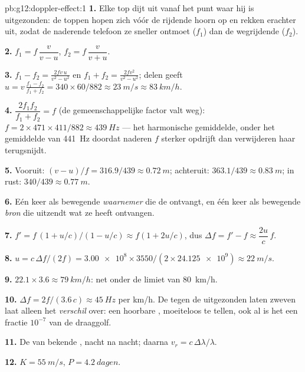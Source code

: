 \begin{solution}{pb:g12:doppler-effect:1}
\textbf{1.} Elke top dijt uit vanaf het punt waar hij is uitgezonden: de
toppen hopen zich vóór de rijdende hoorn op en rekken erachter uit, zodat
de naderende telefoon ze sneller ontmoet ($f_1$) dan de wegrijdende
($f_2$).

\textbf{2.} $f_1 = f\,\dfrac{v}{v - u}$, \quad
$f_2 = f\,\dfrac{v}{v + u}$.

\textbf{3.} $f_1 - f_2 = \frac{2fv\,u}{v^2 - u^2}$ en
$f_1 + f_2 = \frac{2fv^2}{v^2 - u^2}$; delen geeft
$u = v\,\frac{f_1 - f_2}{f_1 + f_2} = 340 \times 60/882 \approx
\qty{23}{m/s} \approx \qty{83}{km/h}$.

\textbf{4.} $\dfrac{2f_1 f_2}{f_1 + f_2} = f$ (de gemeenschappelijke
factor valt weg): $f = 2 \times 471 \times 411/882 \approx \qty{439}{Hz}$
--- het harmonische gemiddelde, onder het gemiddelde van \qty{441}{Hz}
doordat naderen $f$ sterker opdrijft dan verwijderen haar terugsnijdt.

\textbf{5.} Vooruit: $(v - u)/f = 316.9/439 \approx \qty{0.72}{m}$;
achteruit: $363.1/439 \approx \qty{0.83}{m}$; in rust:
$340/439 \approx \qty{0.77}{m}$.

\textbf{6.} Eén keer als bewegende \emph{waarnemer} die de  ontvangt,
en één keer als bewegende \emph{bron} die uitzendt wat ze heeft
ontvangen.

\textbf{7.} $f' = f\,(1 + u/c)/(1 - u/c) \approx f(1 + 2u/c)$, dus
$\Delta f = f' - f \approx \dfrac{2u}{c}\,f$.

\textbf{8.} $u = c\,\Delta f/(2f) = \num{3.00e8} \times 3550/(2 \times
\num{24.125e9}) \approx \qty{22}{m/s}$.

\textbf{9.} $22.1 \times 3.6 \approx \qty{79}{km/h}$: net onder de limiet
van \qty{80}{km/h}.

\textbf{10.} $\Delta f = 2f/(3.6\,c) \approx \qty{45}{Hz}$ per
\unit{km/h}. De  tegen de uitgezonden  laten zweven laat alleen
het \emph{verschil} over: een hoorbare , moeiteloos te tellen,
ook al is het een fractie $10^{-7}$ van de draaggolf.

\textbf{11.} De  van bekende , nacht na nacht;
daarna $v_r = c\,\Delta\lambda/\lambda$.

\textbf{12.} $K = \qty{55}{m/s}$, $P = \qty{4.2}{dagen}$.


\end{solution}
